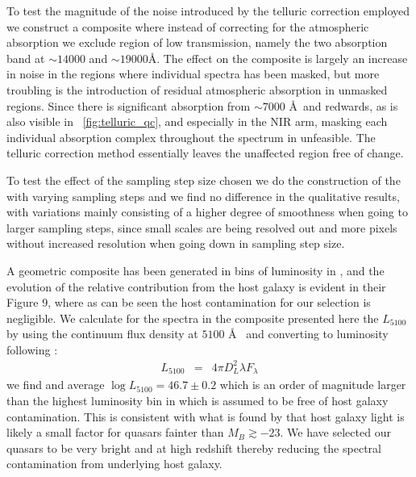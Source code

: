 \documentclass{aa}    %
\newcommand{\figref}[1]{\ref{fig:#1}}
\newcommand{\Fig}[1]{\figurename~\figref{#1}}
\newcommand{\fig}[1]{\Fig{#1}}
\newcommand{\eqlabel}[1]{\label{eq:#1}}
\begin{document}
To test the magnitude of the noise introduced by the telluric correction employed we construct a composite where instead of correcting for the atmospheric absorption we exclude region of low transmission, namely the two absorption band at $\sim 14000$ and $\sim 19000$\AA. The effect on the composite is largely an increase in noise in the regions where individual spectra has been masked, but more troubling is the introduction of residual atmospheric absorption in unmasked regions. Since there is significant absorption from $\sim 7000$ \AA~and redwards, as is also visible in \fig{telluric_qc}, and especially in the NIR arm, masking each individual absorption complex throughout the spectrum in unfeasible. The telluric correction method essentially leaves the unaffected region free of change. 



To test the effect of the sampling step size chosen we do the construction of the with varying sampling steps and we find no difference in the qualitative results, with variations mainly consisting of a higher degree of smoothness when going to larger sampling steps, since small scales are being resolved out and more pixels without increased resolution when going down in sampling step size. 

 
 
A geometric composite has been generated in bins of luminosity in \citep{Shen2011}, and the evolution of the relative contribution from the host galaxy is evident in their Figure 9, where as can be seen the host contamination for our selection is negligible. We calculate for the spectra in the composite presented here the $L_{5100}$ by using the continuum flux density at $5100$ \AA~ and converting to luminosity following \cite{Netzer2007}:
\begin{eqnarray}\eqlabel{l5100}
L_{5100} &=&    4 \pi D_{L} ^{2} \lambda  F_{\lambda}
\end{eqnarray}
we find and average $\log L_{5100} = 46.7 \pm 0.2$ which is an order of magnitude larger than the highest luminosity bin in \cite{Shen2011} which is assumed to be free of host galaxy contamination. This
is consistent with what is found by \citep{Hopkins2007} that host galaxy light is likely a small factor for quasars fainter than $M_{B} \gtrsim -23$. We have selected our quasars to be very bright and at high redshift thereby reducing the spectral contamination from underlying host galaxy. 
\end{document}
